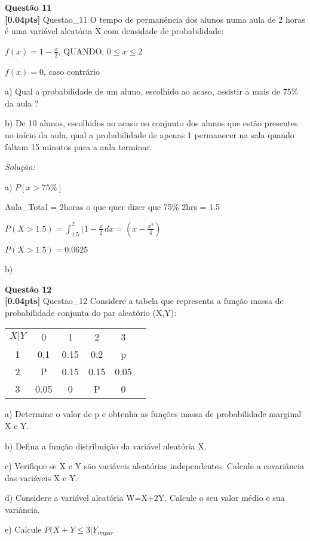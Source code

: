\documentclass{article}
\newenvironment{problem}[2][Questão]
    { \begin{mdframed}[backgroundcolor=gray!20] \textbf{#1 #2} \\}
    {  \end{mdframed}}
\newenvironment{solution}
    {\textit{Solução:}}
    {}
\begin{document}
\begin{problem}{11}
\textbf{[0.04pts]} Questao\_11 O tempo de permanência dos alunos numa aula de 2 horas é uma variável aleatória X com densidade de probabilidade: 


$f(x) = 1-\frac{x}{2}$, QUANDO, $0 \leq x \leq 2$

$f(x) = 0$, caso contrário

a) Qual a probabilidade de um aluno, escolhido ao acaso, assistir a mais de 75\% da aula ?

b) De  10  alunos,  escolhidos  ao  acaso  no  conjunto  dos  alunos  que  estão  presentes  no início  da  aula,  qual  a  probabilidade  de  apenas  1  permanecer  na  sala  quando  faltam  15 minutos para a aula terminar. 

\end{problem}

\begin{solution}

a) $P[x>75\%]$

Aula_Total = 2horas o que quer dizer que 75\% 2hrs = 1.5

$P(X > 1.5) = \int_{1.5}^{2} (1-\frac{x}{2} \,dx = (x-\frac{x^{2}}{4})$

$P(X > 1.5) = 0.0625$

b) 


\end{solution}

\begin{problem}{12}
\textbf{[0.04pts]} Questao\_12 Considere a tabela que representa a função massa de probabilidade conjunta do par 
aleatório (X,Y): 

\begin{center}
\begin{tabular}{ |c|c|c|c|c|c|}
\hline

$X|Y$ & 0 & 1 & 2 & 3  \\
1 & 0,1 & 0.15 & 0.2 & p  \\
2 & P & 0.15 & 0.15 & 0.05 \\
3 & 0.05 & 0 & P & 0  \\
 \hline
\end{tabular}
\end{center}

a) Determine o valor de p e obtenha as funções massa de probabilidade marginal X e Y.

b) Defina a função distribuição da variável aleatória X.

c) Verifique se X e Y são variáveis aleatórias independentes. Calcule a covariância das variáveis X e Y.

d) Considere a  variável  aleatória W=X+2Y.  Calcule  o  seu  valor  médio e  sua variância.

e) Calcule $P(X+Y \leq 3 | Y_{impar}$ 

\end{problem}
\end{document}
